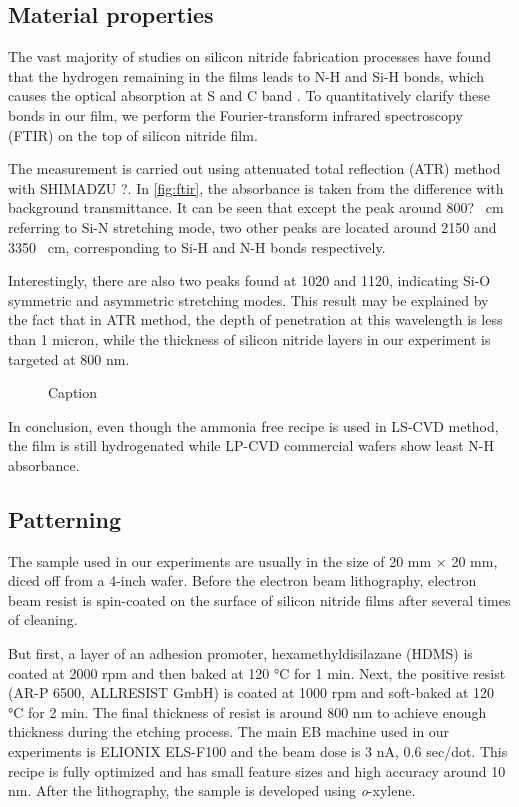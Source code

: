 \subsection{Material properties}
The vast majority of studies on silicon nitride fabrication processes have found that the hydrogen remaining in the films leads to N-H and Si-H bonds, which causes the optical absorption at S and C band \cites{Ay2004, Agnihotri2000}. To quantitatively clarify these bonds in our film, we perform the Fourier-transform infrared spectroscopy (FTIR) on the top of silicon nitride film.

The measurement is carried out using attenuated total reflection (ATR) method with SHIMADZU ?. In \autoref{fig:ftir}, the absorbance is taken from the difference with background transmittance. It can be seen that except the peak around 800? \si{\per\cm} referring to Si-N stretching mode, two other peaks are located around 2150 and 3350 \si{\per\cm}, corresponding to Si-H and N-H bonds respectively.

Interestingly, there are also two peaks found at 1020 and 1120, indicating Si-O symmetric and asymmetric stretching modes. This result may be explained by the fact that in ATR method, the depth of penetration at this wavelength is less than 1 micron, while the thickness of silicon nitride layers in our experiment is targeted at 800 nm.

\begin{figure}
    \centering
    
    \caption{Caption}
    \label{fig:ftir}
\end{figure}

In conclusion, even though the ammonia free recipe is used in LS-CVD method, the film is still hydrogenated while LP-CVD commercial wafers show least N-H absorbance.

\subsection{Patterning}
The sample used in our experiments are usually in the size of 20 mm $\times$ 20 mm, diced off from a 4-inch wafer. Before the electron beam lithography, electron beam resist is spin-coated on the surface of silicon nitride films after several times of cleaning. 

But first, a layer of an adhesion promoter, hexamethyldisilazane (HDMS) is coated at 2000 rpm and then baked at 120 \si{\celsius} for 1 min. Next, the positive resist (AR-P 6500, ALLRESIST GmbH) is coated at 1000 rpm and soft-baked at 120 \si{\celsius} for 2 min. The final thickness of resist is around 800 nm to achieve enough thickness during the etching process. The main EB machine used in our experiments is ELIONIX ELS-F100 and the beam dose is 3 nA, 0.6 sec/dot. This recipe is fully optimized and has small feature sizes and high accuracy around 10 nm. After the lithography, the sample is developed using \textit{o}-xylene. 

